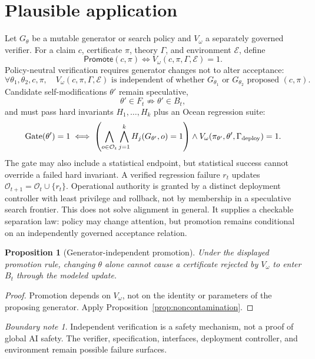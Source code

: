 \documentclass[11pt,oneside]{book}
\newtheorem{proposition}[theorem]{Proposition}
\theoremstyle{definition}
\theoremstyle{remark}
\newtheorem{boundary}[theorem]{Boundary note}
\newcommand{\OCEAN}{\mathcal O}
\newcommand{\Promote}{\mathsf{Promote}}
\begin{document}
\section{Plausible application}
Let \(G_\theta\) be a mutable generator or search policy and \(V_\omega\) a separately governed
verifier. For a claim \(c\), certificate \(\pi\), theory \(\Gamma\), and environment \(\mathcal E\),
define
\[
\Promote(c,\pi)
\iff V_\omega(c,\pi,\Gamma,\mathcal E)=1.
\]
Policy-neutral verification requires generator changes not to alter acceptance:
\[
\forall\theta_1,\theta_2,c,\pi,
\quad
V_\omega(c,\pi,\Gamma,\mathcal E)
\text{ is independent of whether }G_{\theta_1}\text{ or }G_{\theta_2}\text{ proposed }(c,\pi).
\]
Candidate self-modifications \(\theta'\) remain speculative,
\[
\theta'\in F_t\not\Rightarrow\theta'\in B_t,
\]
and must pass hard invariants \(H_1,\ldots,H_k\) plus an Ocean regression suite:
\[
\operatorname{Gate}(\theta')=1
\iff
\left(\bigwedge_{o\in\OCEAN_t}\bigwedge_{j=1}^{k}H_j(G_{\theta'},o)=1\right)
\land V_\omega(\pi_{\theta'},\theta',\Gamma_{\rm deploy})=1.
\]
The gate may also include a statistical endpoint, but statistical success cannot override a failed hard
invariant. A verified regression failure \(r_t\) updates \(\OCEAN_{t+1}=\OCEAN_t\cup\{r_t\}\).
Operational authority is granted by a distinct deployment controller with least privilege and rollback,
not by membership in a speculative search frontier. This does not solve alignment in general. It
supplies a checkable separation law: policy may change attention, but promotion remains conditional
on an independently governed acceptance relation.

\begin{proposition}[Generator-independent promotion]
Under the displayed promotion rule, changing \(\theta\) alone cannot cause a certificate rejected by
\(V_\omega\) to enter \(B_t\) through the modeled update.
\end{proposition}

\begin{proof}
Promotion depends on \(V_\omega\), not on the identity or parameters of the proposing generator.
Apply Proposition~\ref{prop:noncontamination}.
\end{proof}

\begin{boundary}
Independent verification is a safety mechanism, not a proof of global AI safety. The verifier,
specification, interfaces, deployment controller, and environment remain possible failure surfaces.
\end{boundary}
\end{document}
